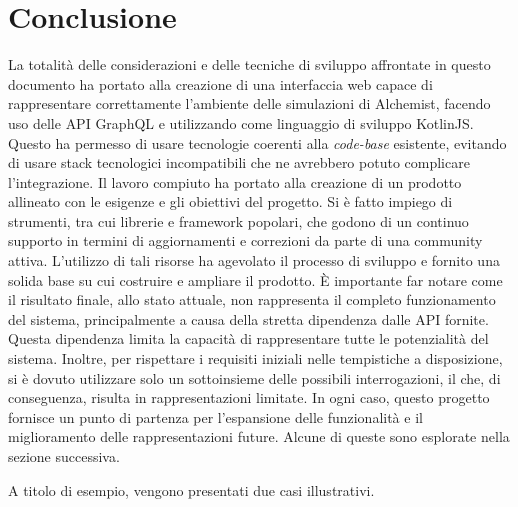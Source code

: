 \chapter{Conclusione}
La totalità delle considerazioni e delle tecniche di sviluppo affrontate in questo documento ha portato alla creazione di una interfaccia web capace di rappresentare correttamente l'ambiente delle simulazioni di Alchemist, facendo uso delle \ac{API} GraphQL e utilizzando come linguaggio di sviluppo KotlinJS. Questo ha permesso di usare tecnologie coerenti alla \textit{code-base} esistente, evitando di usare stack tecnologici incompatibili che ne avrebbero potuto complicare l'integrazione. Il lavoro compiuto ha portato alla creazione di un prodotto allineato con le esigenze e gli obiettivi del progetto. 
Si è fatto impiego di strumenti, tra cui librerie e framework popolari, che godono di un continuo supporto in termini di aggiornamenti e correzioni da parte di una community attiva. L'utilizzo di tali risorse ha agevolato il processo di sviluppo e fornito una solida base su cui costruire e ampliare il prodotto.
È importante far notare come il risultato finale, allo stato attuale, non rappresenta il completo funzionamento del sistema, principalmente a causa della stretta dipendenza dalle \ac{API} fornite. Questa dipendenza limita la capacità di rappresentare tutte le potenzialità del sistema. Inoltre, per rispettare i requisiti iniziali nelle tempistiche a disposizione, si è dovuto utilizzare solo un sottoinsieme delle possibili interrogazioni, il che, di conseguenza, risulta in rappresentazioni limitate. In ogni caso, questo progetto fornisce un punto di partenza per l'espansione delle funzionalità e il miglioramento delle rappresentazioni future. Alcune di queste sono esplorate nella sezione successiva.

A titolo di esempio, vengono presentati due casi illustrativi.


